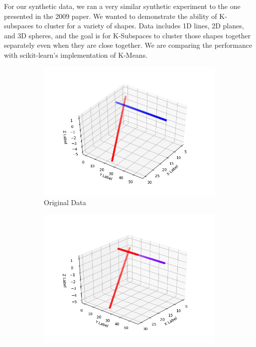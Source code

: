 \documentclass[12pt]{article}
\begin{document}
\begin{enumerate}
For our synthetic data, we ran a very similar synthetic experiment to the one presented in the 2009 paper. We wanted to demonstrate the ability of K-subspaces to cluster for a variety of shapes. Data includes 1D lines, 2D planes, and 3D spheres, and the goal is for K-Subspaces to cluster those shapes together separately even when they are close together. We are comparing the performance with scikit-learn's implementation of K-Means. 

\begin{figure}
    \centering
    \begin{subfigure}[b]{0.3\textwidth}
        \includegraphics[width=\textwidth]{ksubfigures/2lines.png}
        \caption{Original Data}
        \label{fig:2lines}
    \end{subfigure}
    \begin{subfigure}[b]{0.3\textwidth}
        \includegraphics[width=\textwidth]{ksubfigures/2lineskmeans.png}

\end{subfigure}
\end{figure}
\end{enumerate}
\end{document}
